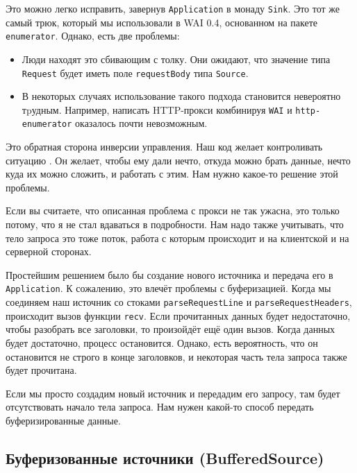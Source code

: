 Это можно легко исправить, завернув \lstinline'Application' в монаду \lstinline{Sink}. 
Это тот же самый трюк, который мы использовали в WAI 0.4, основанном на пакете \texttt{enumerator}. 
Однако, есть две проблемы:

\begin{itemize}
\item Люди находят это сбивающим с толку. Они ожидают, что значение типа 
\lstinline'Request' будет иметь поле \lstinline'requestBody' типа 
\lstinline'Source'.
\item В некоторых случаях использование такого подхода становится невероятно 
тpудным. Например, написать HTTP-прокси комбинируя \texttt{WAI} и \texttt{http-enumerator} 
оказалось почти невозможным.
\end{itemize}
Это обратная сторона инверсии управления. Наш код желает контроливать ситуацию
. Он желает, чтобы ему дали нечто, откуда можно брать данные, нечто
куда их можно сложить, и работать с этим. Нам нужно какое-то решение этой проблемы.

\begin{remark}
Если вы считаете, что описанная проблема с прокси не так ужасна, это только потому, что
я не стал вдаваться в подробности.
Нам надо также учитывать, что тело запроса это тоже поток,
работа с которым происходит и на клиентской и на серверной сторонах.
\end{remark}

Простейшим решением было бы создание нового источника и передача его в \lstinline{Application}.
К сожалению, это влечёт проблемы с буферизацией. Когда мы соединяем 
наш источник со стоками \lstinline'parseRequestLine' и \lstinline'parseRequestHeaders',
происходит вызов функции \lstinline'recv'.
Если прочитанных данных будет недостаточно, чтобы разобрать все заголовки, то 
произойдёт ещё один вызов. Когда данных будет достаточно, процесс остановится. 
Однако, есть вероятность, что он остановится не строго в конце заголовков, и некоторая 
часть тела запроса также будет прочитана.

Если мы просто создадим новый источник и передадим его запросу, там будет
отсутствовать начало тела запроса. Нам нужен какой-то способ передать
буферизированные данные.

\subsection{Буферизованные источники (BufferedSource)}


